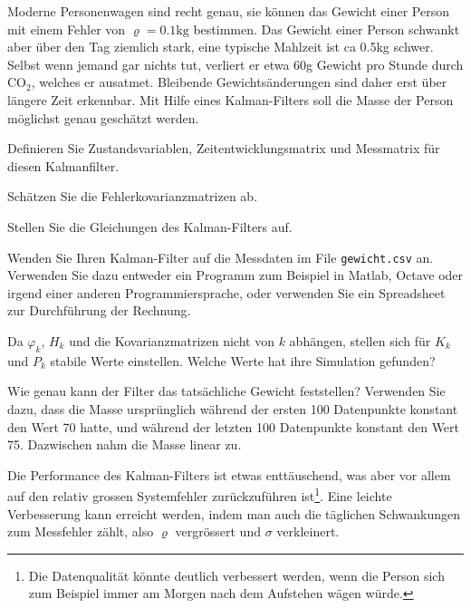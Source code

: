 Moderne Personenwagen sind recht genau, sie können das Gewicht einer
Person mit einem Fehler von $\varrho=0.1\text{kg}$ bestimmen.
Das Gewicht einer Person schwankt aber über den Tag ziemlich stark,
eine typische Mahlzeit ist ca 0.5kg schwer.
Selbst wenn jemand gar nichts tut, verliert er etwa 60g Gewicht pro
Stunde durch $\text{CO}_2$, welches er ausatmet.
Bleibende Gewichtsänderungen sind daher erst über längere Zeit erkennbar.
Mit Hilfe eines Kalman-Filters soll die Masse der Person möglichst genau
geschätzt werden.

\begin{teilaufgaben}
\item
Definieren Sie Zustandsvariablen, Zeitentwicklungsmatrix und Messmatrix
für diesen Kalmanfilter.
\item
Schätzen Sie die Fehlerkovarianzmatrizen ab.
\item 
Stellen Sie die Gleichungen des Kalman-Filters auf.
\item
Wenden Sie Ihren Kalman-Filter auf die Messdaten im File \texttt{gewicht.csv} an.
Verwenden Sie dazu entweder ein Programm zum Beispiel in Matlab, Octave oder
irgend einer anderen Programmiersprache, oder verwenden Sie ein Spreadsheet
zur Durchführung der Rechnung.
\item
Da $\varphi_k$, $H_k$ und die Kovarianzmatrizen nicht von $k$ abhängen,
stellen sich für $K_k$ und $P_k$ stabile Werte einstellen.
Welche Werte hat ihre Simulation gefunden?
\item
Wie genau kann der Filter das tatsächliche Gewicht feststellen?
Verwenden Sie dazu, dass die Masse ursprünglich während der ersten
100 Datenpunkte konstant den Wert 70 hatte, und während der letzten
100 Datenpunkte konstant den Wert 75.
Dazwischen nahm die Masse linear zu.
\item
Die Performance des Kalman-Filters ist etwas enttäuschend, was aber
vor allem auf den relativ grossen Systemfehler zurückzuführen
ist\footnote{Die Datenqualität könnte deutlich verbessert werden, wenn
die Person sich zum Beispiel immer am Morgen nach dem Aufstehen wägen
würde.}.
Eine leichte Verbesserung kann erreicht werden, indem man auch die
täglichen Schwankungen zum Messfehler zählt, also $\varrho$ vergrössert
und $\sigma$ verkleinert. 
\end{teilaufgaben}


